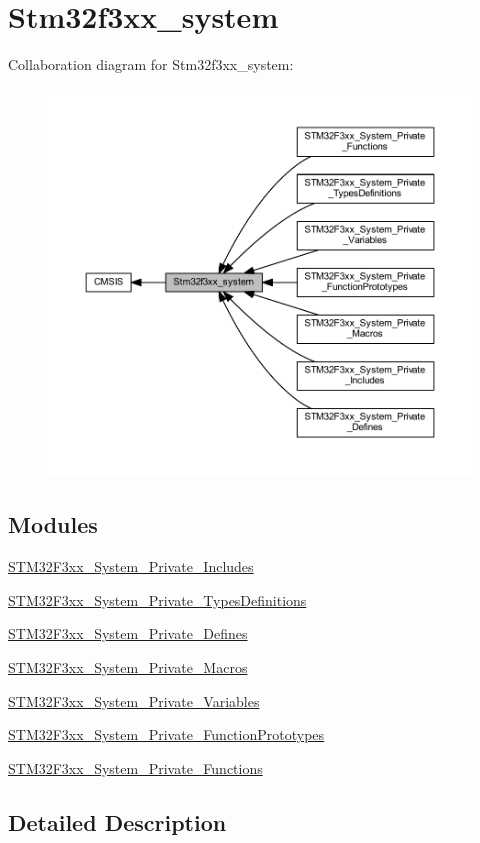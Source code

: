 \hypertarget{group__stm32f3xx__system}{}\section{Stm32f3xx\+\_\+system}
\label{group__stm32f3xx__system}
Collaboration diagram for Stm32f3xx\+\_\+system\+:\nopagebreak
\begin{figure}[H]
\begin{center}
\leavevmode
\includegraphics[width=350pt]{group__stm32f3xx__system}
\end{center}
\end{figure}
\subsection*{Modules}
\begin{DoxyCompactItemize}
\item 
\hyperlink{group___s_t_m32_f3xx___system___private___includes}{S\+T\+M32\+F3xx\+\_\+\+System\+\_\+\+Private\+\_\+\+Includes}
\item 
\hyperlink{group___s_t_m32_f3xx___system___private___types_definitions}{S\+T\+M32\+F3xx\+\_\+\+System\+\_\+\+Private\+\_\+\+Types\+Definitions}
\item 
\hyperlink{group___s_t_m32_f3xx___system___private___defines}{S\+T\+M32\+F3xx\+\_\+\+System\+\_\+\+Private\+\_\+\+Defines}
\item 
\hyperlink{group___s_t_m32_f3xx___system___private___macros}{S\+T\+M32\+F3xx\+\_\+\+System\+\_\+\+Private\+\_\+\+Macros}
\item 
\hyperlink{group___s_t_m32_f3xx___system___private___variables}{S\+T\+M32\+F3xx\+\_\+\+System\+\_\+\+Private\+\_\+\+Variables}
\item 
\hyperlink{group___s_t_m32_f3xx___system___private___function_prototypes}{S\+T\+M32\+F3xx\+\_\+\+System\+\_\+\+Private\+\_\+\+Function\+Prototypes}
\item 
\hyperlink{group___s_t_m32_f3xx___system___private___functions}{S\+T\+M32\+F3xx\+\_\+\+System\+\_\+\+Private\+\_\+\+Functions}
\end{DoxyCompactItemize}


\subsection{Detailed Description}
